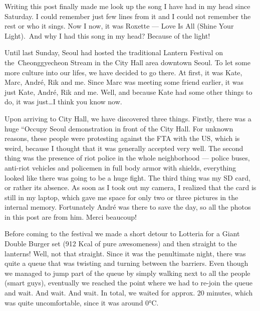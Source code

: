\begin{post}
	\begin{content}
Writing this post finally made me look up the song I have had in my head since Saturday. I could remember just few lines from it and I could not remember the rest or who it sings. Now I now, it was Roxette --- Love Is All (Shine Your Light). And why I had this song in my head? Because of the light!

\begin{figure}[h]
\centering
{}
\end{figure}

Until last Sunday, Seoul had hosted the traditional Lantern Festival on the Cheonggyecheon Stream in the City Hall area downtown Seoul. To let some more culture into our lifes, we have decided to go there. At first, it was Kate, Marc, André, Rik and me. Since Marc was meeting some friend earlier, it was just Kate, André, Rik and me. Well, and because Kate had some other things to do, it was just{\ldots}I think you know now.

Upon arriving to City Hall, we have discovered three things. Firstly, there was a huge ``Occupy Seoul demonstration in front of the City Hall. For unknown reasons, these people were protesting against the FTA with the US, which is weird, because I thought that it was generally accepted very well. The second thing was the presence of riot police in the whole neighborhood --- police buses, anti-riot vehicles and policemen in full body armor with shields, everything looked like there was going to be a huge fight. The third thing was my SD card, or rather its absence. As soon as I took out my camera, I realized that the card is still in my laptop, which gave me space for only two or three pictures in the internal memory. Fortunately André was there to save the day, so all the photos in this post are from him. Merci beaucoup!

Before coming to the festival we made a short detour to Lotteria for a Giant Double Burger set (912 Kcal of pure awesomeness) and then straight to the lanterns! Well, not that straight. Since it was the penultimate night, there was quite a queue that was twisting and turning between the barriers. Even though we managed to jump part of the queue by simply walking next to all the people (smart guys), eventually we reached the point where we had to re-join the queue and wait. And wait. And wait. In total, we waited for approx. 20 minutes, which was quite uncomfortable, since it was around 0°C.


\end{content}
\end{post}
